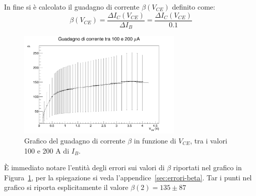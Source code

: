 \documentclass[../main.tex]{subfiles}
\begin{document}
    In fine si è calcolato il guadagno di corrente $\beta(V_{CE})$ definito come:
    \begin{equation*}
        \beta(V_{CE}) = \frac{\varDelta I_C(V_{CE})}{\varDelta I_B} = \frac{\varDelta I_C(V_{CE})}{0.1}
    \end{equation*}

    \begin{figure}[h!]
        \centering
        \includegraphics[width=0.7\textwidth]{../../images/beta}
        \caption{
            Grafico del guadagno di corrente $\beta$ in funzione di
            $V_{CE}$, tra i valori 100 e 200 \textmu A di $I_B$.
        }
        \label{fig:beta}
    \end{figure}
    È immediato notare l'entità degli errori sui valori di $\beta$
    riportati nel grafico in Figura~\ref{fig:beta}, per la
    spiegazione si veda l'appendice~\ref{sec:errori-beta}.
    Tar i punti nel grafico si riporta esplicitamente il valore $\beta(2) = 135 \pm  87$
\end{document}
